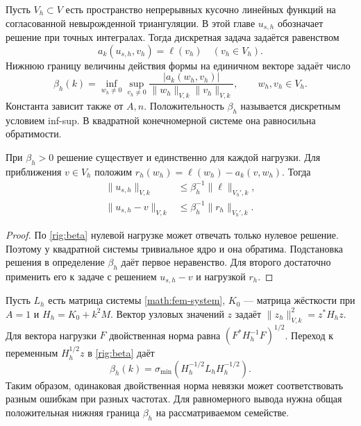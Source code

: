 Пусть $V_h\subset V$ есть пространство непрерывных кусочно линейных
функций на согласованной невырожденной триангуляции. В этой главе $u_{s,h}$
обозначает решение при точных интегралах. Тогда дискретная задача
задаётся равенством
\begin{equation}
 a_k(u_{s,h},v_h)=\ell(v_h)\quad(v_h\in V_h).\label{rig:galerkin}
\end{equation}
Нижнюю границу величины действия формы на единичном векторе задаёт число
\begin{equation}
 \beta_h(k)=\inf_{w_h\ne0}\sup_{v_h\ne0}
 \frac{|a_k(w_h,v_h)|}{\|w_h\|_{V,k}\|v_h\|_{V,k}},\qquad w_h,v_h\in V_h.
 \label{rig:beta}
\end{equation}
Константа зависит также от $A,n$. Положительность $\beta_h$ называется
дискретным условием inf-sup. В квадратной конечномерной системе она
равносильна обратимости.

\begin{theorem}
При $\beta_h>0$ решение существует и единственно для каждой нагрузки.
Для приближения $v\in V_h$ положим $r_h(w_h)=\ell(w_h)-a_k(v,w_h)$.
Тогда
\begin{align}
 \|u_{s,h}\|_{V,k}&\le\beta_h^{-1}\|\ell\|_{V_h',k},\label{rig:discrete-stability}\\
 \|u_{s,h}-v\|_{V,k}&\le\beta_h^{-1}\|r_h\|_{V_h',k}.\label{rig:residual-estimate}
\end{align}
\end{theorem}
\begin{proof}
По \eqref{rig:beta} нулевой нагрузке может отвечать только нулевое
решение. Поэтому у квадратной системы тривиальное ядро и она обратима.
Подстановка решения в определение $\beta_h$ даёт первое неравенство.
Для второго достаточно применить его к задаче с решением $u_{s,h}-v$
и нагрузкой $r_h$.
\end{proof}

Пусть $L_h$ есть матрица системы \eqref{math:fem-system}, $K_0$ ---
матрица жёсткости при $A=1$ и $H_h=K_0+k^2M$. Вектор узловых значений
$z$ задаёт $\|z_h\|_{V,k}^2=z^*H_hz$. Для вектора нагрузки $F$
двойственная норма равна $(F^*H_h^{-1}F)^{1/2}$. Переход к переменным
$H_h^{1/2}z$ в \eqref{rig:beta} даёт
\begin{equation}
 \beta_h(k)=\sigma_{\min}(H_h^{-1/2}L_hH_h^{-1/2}).\label{rig:beta-matrix}
\end{equation}
Таким образом, одинаковая двойственная норма невязки может соответствовать
разным ошибкам при разных частотах. Для равномерного вывода нужна общая
положительная нижняя граница $\beta_h$ на рассматриваемом семействе.

